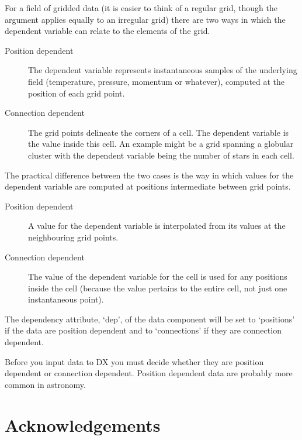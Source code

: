 \documentclass[twoside,11pt]{article}
\newcommand{\xlabel}[1]{}
\begin{document}
For a field of gridded data (it is easier to think of a regular grid,
though the argument applies equally to an irregular grid) there are two
ways in which the dependent variable can relate to the elements of the
grid.

\begin{description}

  \item[Position dependent] The dependent variable represents
   instantaneous samples of the underlying field (temperature, pressure,
   momentum or whatever), computed at the position of each grid point.

  \item[Connection dependent] The grid points delineate the corners
   of a cell. The dependent variable is the value inside this cell.
   An example might be a grid spanning a globular cluster with the
   dependent variable being the number of stars in each cell.

\end{description}

The practical difference between the two cases is the way in which
values for the dependent variable are computed at positions intermediate
between grid points.

\begin{description}

  \item[Position dependent] A value for the dependent variable is
   interpolated from its values at the neighbouring grid points.

  \item[Connection dependent] The value of the dependent variable for
   the cell is used for any positions inside the cell (because the
   value pertains to the entire cell, not just one instantaneous
   point).

\end{description}

The dependency attribute, `dep', of the data component will be set to
`positions' if the data are position dependent and to `connections' if
they are connection dependent.

Before you input data to DX you must decide whether they are position
dependent or connection dependent. Position dependent data are probably
more common in astronomy.


\newpage
\section{\xlabel{ACK}\label{ACK}Acknowledgements}
\end{document}
